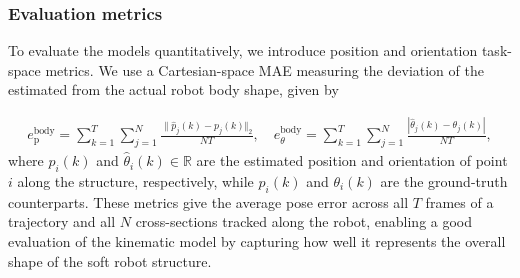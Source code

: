 
\subsubsection{Evaluation metrics}
To evaluate the models quantitatively, we introduce position and orientation task-space metrics. 
We use a Cartesian-space \gls{MAE} measuring the deviation of the estimated from the actual robot body shape, given by

\begin{equation}
\begin{split}
     e_\mathrm{p}^{\mathrm{body}} = \sum_{k=1}^T \sum_{j=1}^N \frac{\lVert \hat{p}_j(k) - p_j(k) \Vert_2}{N T},
     \quad
    e_{\theta}^{\mathrm{body}} = \sum_{k=1}^T \sum_{j=1}^N \frac{| \hat{\theta}_j(k) - \theta_j(k) |}{N T},
\end{split}
\end{equation}
where 
$\hat{p}_i(k)$ and $\hat{\theta}_i(k) \in \mathbb{R}$ are the estimated position and orientation of point $i$ along the structure, respectively, while $p_i(k)$ and $\theta_i(k)$ are the ground-truth counterparts. These metrics give the average pose error across all $T$ frames of a trajectory and all $N$ cross-sections tracked along the robot, enabling a good evaluation of the kinematic model by capturing how well it represents the overall shape of the soft robot structure.

